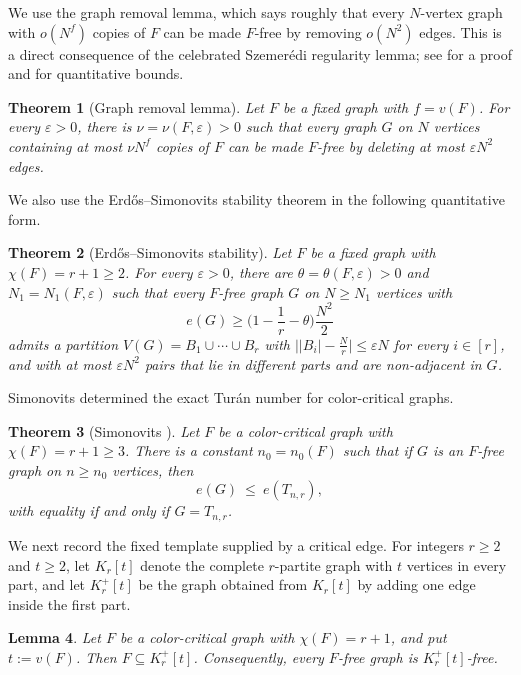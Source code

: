 \documentclass[11pt, a4paper]{article}
\newtheorem{theorem}{Theorem}[section]
\newtheorem{lemma}[theorem]{Lemma}
\theoremstyle{definition}
\theoremstyle{plain}
\renewcommand{\le}{\leqslant}
\renewcommand{\ge}{\geqslant}
\begin{document}
We use the graph removal lemma, which says roughly that 
every $N$-vertex graph with $o(N^f)$ copies of $F$ can be made $F$-free by removing $o(N^2)$ edges. This is a direct consequence of the celebrated Szemer\'{e}di regularity lemma; 
 see \cite{Fox2011} for a proof and for quantitative bounds.

\begin{theorem}[Graph removal lemma]\label{thm:removal}
Let $F$ be a fixed graph with $f=v(F)$. For every
$\varepsilon >0$, there is $\nu =\nu (F,\varepsilon )>0$
such that every graph $G$ on $N$ vertices containing at most $\nu N^{f}$ copies of $F$ can be made $F$-free by deleting at most $\varepsilon N^{2}$ edges.
\end{theorem} 


We also use the Erd\H{o}s--Simonovits stability theorem \cite{Sim1968}
 in the following quantitative form.

\begin{theorem}[Erd\H{o}s--Simonovits stability]
\label{thm:stability}
Let $F$ be a fixed graph with $\chi (F)=r+1\ge 2$. For
every $\varepsilon >0$, there are $\theta =\theta
(F,\varepsilon )>0$ and $N_1=N_1(F,\varepsilon )$ such
that every $F$-free graph $G$ on $N\ge N_1$ vertices with 
$$e(G)\ge \Big(1-\frac1r-\theta \Big)\frac{N^{2}}{2}$$ 
admits a partition $V(G)=B_1\cup \cdots \cup B_r$ with
$\bigl\lvert |B_i|-\frac Nr\bigr\rvert \le \varepsilon N$
for every $i\in [r]$, and with at most $\varepsilon N^{2}$
pairs that lie in different parts and are non-adjacent
in $G$.
\end{theorem}


Simonovits \cite{Sim1968} determined the
exact Tur\'{a}n number for color-critical 
graphs.

\begin{theorem}[Simonovits \cite{Sim1968}]
\label{thm:simonovits}
Let $F$ be a color-critical graph with
$\chi (F)=r+1\ge 3$. There is a constant
$n_0=n_0(F)$ such that if $G$ is an $F$-free graph on $n\ge n_0$ vertices, then 
\[
  e(G) \ \le \ e(T_{n,r}),
\]
with equality if and only if $G=T_{n,r}$.
\end{theorem}

We next record the fixed template supplied by a
critical edge. For integers $r\ge 2$ and $t\ge 2$,
let $K_r[t]$ denote the complete $r$-partite graph
with $t$ vertices in every part, and let
$K_r^+[t]$ be the graph obtained from $K_r[t]$ by
adding one edge inside the first part.

\begin{lemma}\label{lem:critical-template}
Let $F$ be a color-critical graph with
$\chi (F)=r+1$, and put $t:=v(F)$. Then
$F\subseteq K_r^+[t]$. Consequently, every $F$-free
graph is $K_r^+[t]$-free.
\end{lemma}
\end{document}
